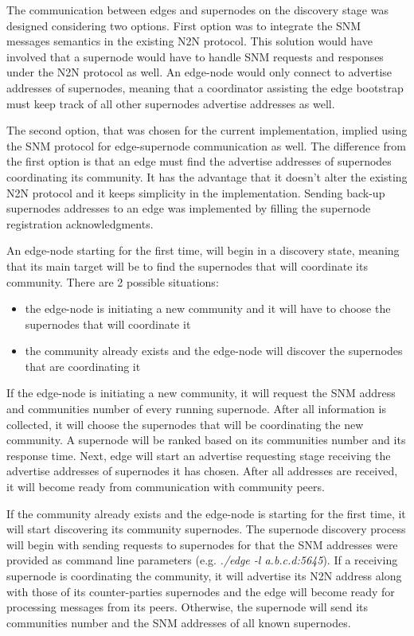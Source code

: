 
The communication between edges and supernodes on the discovery stage was designed considering two options. First option was to integrate the SNM messages semantics in the existing N2N protocol. This solution would have involved that a supernode would have to handle SNM requests and responses under the N2N protocol as well. An edge-node would only connect to advertise addresses of supernodes, meaning that a coordinator assisting the edge bootstrap must keep track of all other supernodes advertise addresses as well.

The second option, that was chosen for the current implementation, implied using the SNM protocol for edge-supernode communication as well. The difference from the first option is that an edge must find the advertise addresses of supernodes coordinating its community. It has the advantage that it doesn't alter the existing N2N protocol and it keeps simplicity in the implementation. Sending back-up supernodes addresses to an edge was implemented by filling the supernode registration acknowledgments.

An edge-node starting for the first time, will begin in a discovery state, meaning that its main target will be to find the supernodes that will coordinate its community. There are 2 possible situations:
\begin{itemize}
\item the edge-node is initiating a new community and it will have to choose the supernodes that will coordinate it
\item the community already exists and the edge-node will discover the supernodes that are coordinating it
\end{itemize}
If the edge-node is initiating a new community, it will request the SNM address and communities number of every running supernode. After all information is collected, it will choose the supernodes that will be coordinating the new community. A supernode will be ranked based on  its communities number and its response time. Next, edge will start an advertise requesting stage receiving the advertise addresses of supernodes it has chosen. After all addresses are received, it will become ready from communication with community peers.

If the community already exists and the edge-node is starting for the first time, it will start discovering its community supernodes. The supernode discovery process will begin with sending requests to supernodes for that the SNM addresses were provided as command line parameters  (e.g. \emph{./edge -l  a.b.c.d:5645}). If a receiving supernode is coordinating the community, it will advertise its N2N address along with those of its counter-parties supernodes and the edge will become ready for processing messages from its peers. Otherwise, the supernode will send its communities number and the SNM addresses of all known supernodes.

